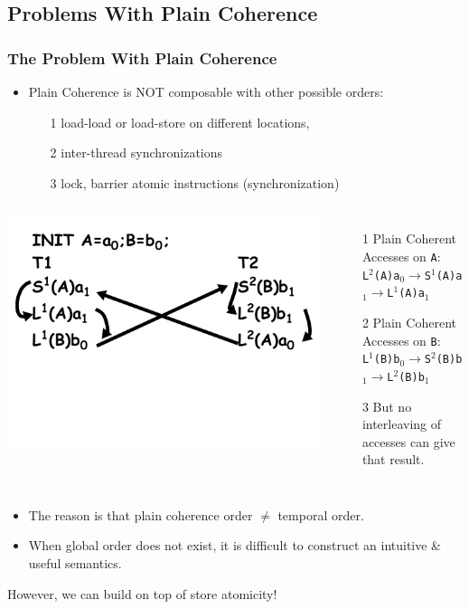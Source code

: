 \documentclass{beamer}
\renewcommand{\emph}[1]{\textcolor{structure}{#1}}
\begin{document}
\subsection{Problems With Plain Coherence}

\begin{frame}[fragile,t]
\frametitle{The Problem With Plain Coherence}

\begin{itemize}
    \item Plain Coherence is NOT composable  with other possible orders: 
    \begin{itemize}
        \item[1] load-load or load-store on different locations,
        \item[2] inter-thread synchronizations
        \item[3] lock, barrier atomic instructions (synchronization)\medskip
    \end{itemize}
\end{itemize}


\begin{columns}
\includegraphics[width=38ex]{Ch7Figs/ProblemPlainCoh}
\vspace{-7ex}
\begin{itemize}
    \item[1] Plain Coherent Accesses on {\tt A}:\\
                {\tt L$^2$(A)a$_0\rightarrow$S$^1$(A)a$_1\rightarrow$L$^1$(A)a$_1$}
    \item[2] Plain Coherent Accesses on {\tt B}:\\
                {\tt L$^1$(B)b$_0\rightarrow$S$^2$(B)b$_1\rightarrow$L$^2$(B)b$_1$}
    \item[3] \alert{But no interleaving of accesses can give that result}. 
\end{itemize}
\end{columns}
\vspace{-7ex}

\begin{itemize}
    \item The reason is that plain coherence order $\neq$ temporal order.
    \item When global order does not exist, it is difficult to construct
            an intuitive \& useful semantics.\medskip
\end{itemize}

\emph{However, we can build on top of store atomicity!}

\end{frame}
\end{document}
